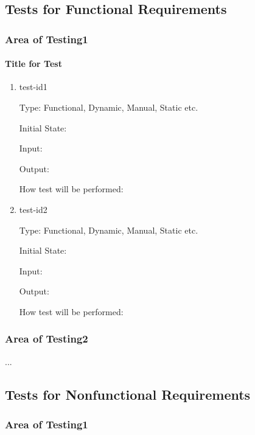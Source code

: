 \documentclass[12pt, titlepage]{article}
\begin{document}
\subsection{Tests for Functional Requirements}

\subsubsection{Area of Testing1}
		
\paragraph{Title for Test}

\begin{enumerate}

\item{test-id1\\}

Type: Functional, Dynamic, Manual, Static etc.
					
Initial State: 
					
Input: 
					
Output: 
					
How test will be performed: 
					
\item{test-id2\\}

Type: Functional, Dynamic, Manual, Static etc.
					
Initial State: 
					
Input: 
					
Output: 
					
How test will be performed: 

\end{enumerate}

\subsubsection{Area of Testing2}

...

\subsection{Tests for Nonfunctional Requirements}

\subsubsection{Area of Testing1}
		
\end{document}
